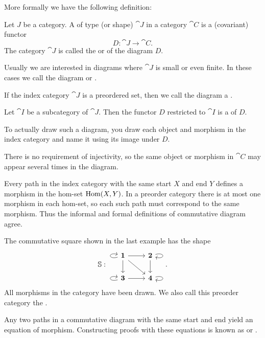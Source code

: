 More formally we have the following definition:
\begin{definition}
Let $J$ be a category.
A  of type (or shape) $\cat{J}$ in a category $\cat{C}$ is a (covariant) functor
\[ D: \cat{J} \to \cat{C}. \]
The category $\cat{J}$ is called the  or  of the diagram $D$.

Usually we are interested in diagrams where $\cat{J}$ is small or even finite. In these cases we call the diagram  or .

If the index category $\cat{J}$ is a preordered set, then we call the diagram a .

Let $\cat{I}$ be a subcategory of $\cat{J}$. Then the functor $D$ restricted to $\cat{I}$ is a  of $D$.
\end{definition}
To actually draw such a diagram, you draw each object and morphism in the index category and name it using its image under $D$.

There is no requirement of injectivity, so the same object or morphism in $\cat{C}$ may appear several times in the diagram.

Every path in the index category with the same start $X$ and end $Y$ defines a morphism in the hom-set $\operatorname{Hom}(X,Y)$. In a preorder category there is at most one morphism in each hom-set, so each such path must correspond to the same morphism. Thus the informal and formal definitions of commutative diagram agree.

\begin{example}
The commutative square shown in the last example has the shape
\[ \mathbb{S}: \begin{tikzcd}
\boldsymbol{1} \ar[loop left] \ar[r] \ar[dr] \ar[d] & \boldsymbol{2} \ar[d] \ar[loop right] \\
\boldsymbol{3} \ar[loop left] \ar[r] & \boldsymbol{4} \ar[loop right]
\end{tikzcd}. \]
All morphisms in the category have been drawn. We also call this preorder category the .
\end{example}

Any two paths in a commutative diagram with the same start and end yield an equation of morphism. Constructing proofs with these equations is known as  or .


